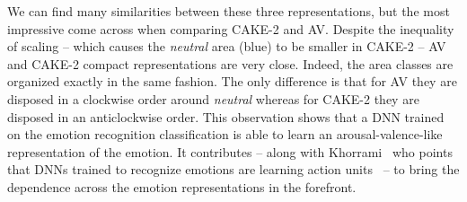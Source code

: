 \documentclass{bmvc2k}
\begin{document}
We can find many similarities between these three representations, but the most impressive come across when comparing CAKE-2 and AV. Despite the inequality of scaling -- which causes the \textit{neutral} area (blue) to be smaller in CAKE-2 -- AV and CAKE-2 compact representations are very close. Indeed, the area classes are organized exactly in the same fashion. The only difference is that for AV they are disposed in a clockwise order around \textit{neutral} whereas for CAKE-2 they are disposed in an anticlockwise order. This observation shows that a DNN trained on the emotion recognition classification is able to learn an arousal-valence-like representation of the emotion. It contributes -- along with Khorrami~\cite{khorrami_deep_2015} who points that DNNs trained to recognize emotions are learning action units~\cite{ekman_measuring_1976} -- to bring the dependence across the emotion representations in the forefront.
\end{document}
